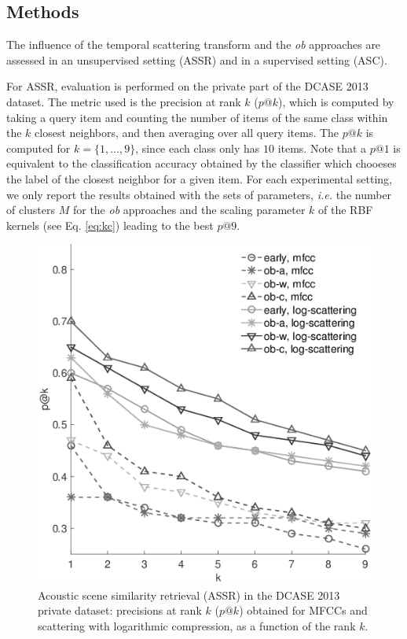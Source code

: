 \documentclass[journal]{IEEEtran}
\newcommand{\ja}[1]{\textcolor{magenta}{Joakim : #1}}
\begin{document}
\subsection{Methods}

The influence of the temporal scattering transform and the \emph{ob} approaches are assessed in an unsupervised setting (ASSR) and in a supervised setting (ASC).

For ASSR, evaluation is performed on the private part of the DCASE 2013 dataset. The metric used is the precision at rank $k$ ($p@k$), which is computed by taking a query item and counting the number of items of the same class within the $k$ closest neighbors, and then averaging over all query items. The $p@k$ is computed for $k=\lbrace 1,\ldots,9\rbrace$, since each class only has $10$ items. Note that a $p@1$ is equivalent to the classification accuracy obtained by the classifier which chooeses the label of the closest neighbor for a given item. For each experimental setting, we only report the results obtained with the sets of parameters, \emph{i.e.} the number of clusters $M$ for the \emph{ob} approaches and the scaling parameter $k$ of the RBF kernels (see Eq. \ref{eq:kc}) leading to the best $p@9$.



\begin{figure}[t]
\begin{center}
\includegraphics[width=.9\columnwidth]{bw/unsupervised_test2}
\caption{Acoustic scene similarity retrieval (ASSR) in the DCASE 2013 private dataset: precisions at rank $k$ ($p@k$) obtained for MFCCs and scattering with logarithmic compression, as a function of the rank $k$.}
\label{fig:ASS_1}
\end{center}
\end{figure}
 
\end{document}
